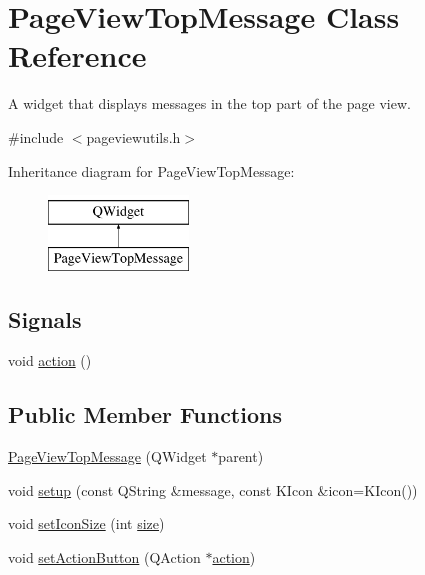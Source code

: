 \hypertarget{classPageViewTopMessage}{\section{Page\+View\+Top\+Message Class Reference}
\label{classPageViewTopMessage}
}


A widget that displays messages in the top part of the page view.  




{\ttfamily \#include $<$pageviewutils.\+h$>$}

Inheritance diagram for Page\+View\+Top\+Message\+:\begin{figure}[H]
\begin{center}
\leavevmode
\includegraphics[height=2.000000cm]{classPageViewTopMessage}
\end{center}
\end{figure}
\subsection*{Signals}
\begin{DoxyCompactItemize}
\item 
void \hyperlink{classPageViewTopMessage_ace79163bbe2ecbbf0e3485e71a8b74d7}{action} ()
\end{DoxyCompactItemize}
\subsection*{Public Member Functions}
\begin{DoxyCompactItemize}
\item 
\hyperlink{classPageViewTopMessage_ad0a214df572f25f1d52f903f0fbb2350}{Page\+View\+Top\+Message} (Q\+Widget $\ast$parent)
\item 
void \hyperlink{classPageViewTopMessage_a1027efb398d2d35a82846c0c92e4d257}{setup} (const Q\+String \&message, const K\+Icon \&icon=K\+Icon())
\item 
void \hyperlink{classPageViewTopMessage_a84bd8394be1e53e1916417875cc571a3}{set\+Icon\+Size} (int \hyperlink{synctex__parser_8c_aa23c661441688350614bd6a350d2b6ff}{size})
\item 
void \hyperlink{classPageViewTopMessage_abd6479ab652d5aa14363382000e1bbfd}{set\+Action\+Button} (Q\+Action $\ast$\hyperlink{classPageViewTopMessage_ace79163bbe2ecbbf0e3485e71a8b74d7}{action})
\end{DoxyCompactItemize}


